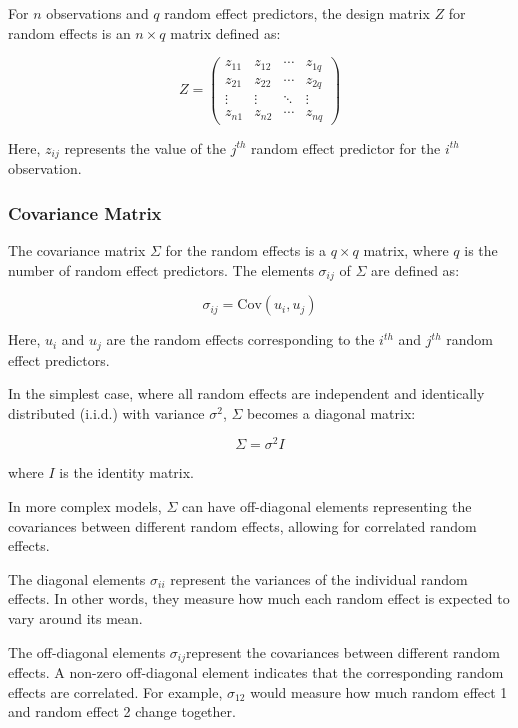 \documentclass[12pt, twoside,hidelinks]{article}
\theoremstyle{definition}
\numberwithin{equation}{section}
\begin{document}
For \( n \) observations and \( q \) random effect predictors, the design matrix \( Z \) for random effects is an \( n \times q \) matrix defined as:

\[
Z = \begin{pmatrix}
z_{11} & z_{12} & \cdots & z_{1q} \\
z_{21} & z_{22} & \cdots & z_{2q} \\
\vdots & \vdots & \ddots & \vdots \\
z_{n1} & z_{n2} & \cdots & z_{nq}
\end{pmatrix}
\]

Here, \( z_{ij} \) represents the value of the \( j^{th} \) random effect predictor for the \( i^{th} \) observation.


\subsubsection{Covariance Matrix}

The covariance matrix \( \Sigma \) for the random effects is a \( q \times q \) matrix, where \( q \) is the number of random effect predictors. The elements \( \sigma_{ij} \) of \( \Sigma \) are defined as:

\[
\sigma_{ij} = \text{Cov}(u_i, u_j)
\]

Here, \( u_i \) and \( u_j \) are the random effects corresponding to the \( i^{th} \) and \( j^{th} \) random effect predictors.
\newline

In the simplest case, where all random effects are independent and identically distributed (i.i.d.) with variance \( \sigma^2 \), \( \Sigma \) becomes a diagonal matrix:

\[
\Sigma = \sigma^2 I
\]

where \( I \) is the identity matrix.
\newline

In more complex models, \( \Sigma \) can have off-diagonal elements representing the covariances between different random effects, allowing for correlated random effects.
\newline

The diagonal elements \( \sigma_{ii} \) represent the variances of the individual random effects. In other words, they measure how much each random effect is expected to vary around its mean.
\newline

The off-diagonal elements \( \sigma_{ij} \)represent the covariances between different random effects. A non-zero off-diagonal element indicates that the corresponding random effects are correlated. For example, \( \sigma_{12} \) would measure how much random effect 1 and random effect 2 change together.
\newline
\end{document}
